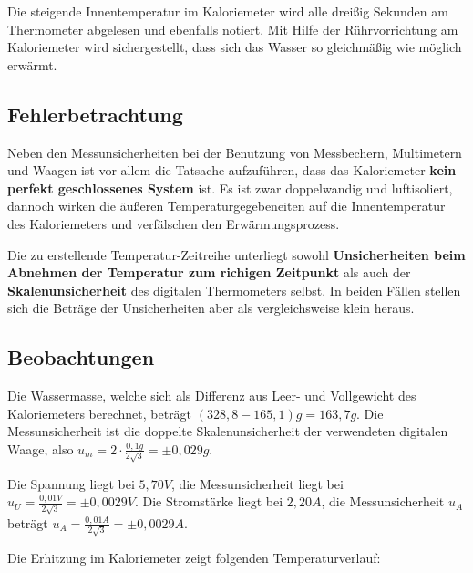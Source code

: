 \documentclass[
  9pt,
]{article}
\begin{document}
Die steigende Innentemperatur im Kaloriemeter wird alle dreißig Sekunden
am Thermometer abgelesen und ebenfalls notiert. Mit Hilfe der
Rührvorrichtung am Kaloriemeter wird sichergestellt, dass sich das
Wasser so gleichmäßig wie möglich erwärmt.

\hypertarget{fehlerbetrachtung}{%
\subsection{Fehlerbetrachtung}\label{fehlerbetrachtung}}

Neben den Messunsicherheiten bei der Benutzung von Messbechern,
Multimetern und Waagen ist vor allem die Tatsache aufzuführen, dass das
Kaloriemeter \textbf{kein perfekt geschlossenes System} ist. Es ist zwar
doppelwandig und luftisoliert, dannoch wirken die äußeren
Temperaturgegebeneiten auf die Innentemperatur des Kaloriemeters und
verfälschen den Erwärmungsprozess.

Die zu erstellende Temperatur-Zeitreihe unterliegt sowohl
\textbf{Unsicherheiten beim Abnehmen der Temperatur zum richigen
Zeitpunkt} als auch der \textbf{Skalenunsicherheit} des digitalen
Thermometers selbst. In beiden Fällen stellen sich die Beträge der
Unsicherheiten aber als vergleichsweise klein heraus.

\hypertarget{beobachtungen}{%
\subsection{Beobachtungen}\label{beobachtungen}}

Die Wassermasse, welche sich als Differenz aus Leer- und Vollgewicht des
Kaloriemeters berechnet, beträgt \((328,8-165,1)g=163,7g\). Die
Messunsicherheit ist die doppelte Skalenunsicherheit der verwendeten
digitalen Waage, also \(u_m=2\cdot \frac{0,1g}{2\sqrt{3}} = \pm0,029g\).

Die Spannung liegt bei \(5,70V\), die Messunsicherheit liegt bei
\(u_U=\frac{0,01V}{2\sqrt{3}}= \pm0,0029V\). Die Stromstärke liegt bei
\(2,20A\), die Messunsicherheit \(u_A\) beträgt
\(u_A=\frac{0,01A}{2\sqrt{3}}=\pm0,0029A\).

Die Erhitzung im Kaloriemeter zeigt folgenden Temperaturverlauf:
\end{document}
